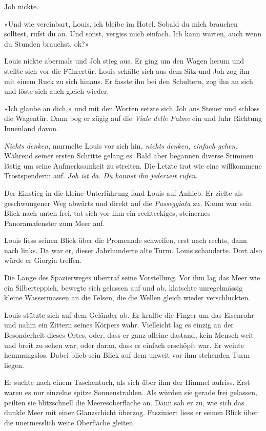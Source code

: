 Joh nickte.

«Und wie vereinbart, Louis, ich bleibe im Hotel. Sobald du mich brauchen
solltest, rufst du an. Und sonst, vergiss mich einfach. Ich kann warten,
auch wenn du Stunden brauchst, ok?»

Louis nickte abermals und Joh stieg aus. Er ging um den Wagen herum und
stellte sich vor die Führertür. Louis schälte sich aus dem Sitz und Joh
zog ihn mit einem Ruck zu sich hinaus. Er fasste ihn bei den Schultern,
zog ihn an sich und löste sich auch gleich wieder.

«Ich glaube an dich,» und mit den Worten setzte sich Joh ans Steuer und
schloss die Wagentür. Dann bog er zügig auf die \emph{Viale delle Palme}
ein und fuhr Richtung Innenland davon.

\emph{Nichts denken,} murmelte Louis vor sich hin\emph{, nichts denken,
einfach gehen.} Während seiner ersten Schritte gelang es. Bald aber
begannen diverse Stimmen lästig um seine Aufmerksamkeit zu streiten. Die
Letzte trat wie eine willkommene Trostspenderin auf. \emph{Joh ist da.
Du kannst ihn jederzeit rufen.}

Der Einstieg in die kleine Unterführung fand Louis auf Anhieb. Er zielte
als geschwungener Weg abwärts und direkt auf die \emph{Passeggiata}
zu\emph{.} Kaum war sein Blick nach unten frei, tat sich vor ihm ein
rechteckiges, steinernes Panoramafenster zum Meer auf.

Louis liess seinen Blick über die Promenade schweifen, erst nach rechts,
dann nach links. Da war er, dieser Jahrhunderte alte Turm. Louis
schauderte. Dort also würde er Giorgia treffen.

Die Länge des Spazierweges übertraf seine Vorstellung. Vor ihm lag das
Meer wie ein Silberteppich, bewegte sich gelassen auf und ab, klatschte
unregelmässig kleine Wassermassen an die Felsen, die die Wellen gleich
wieder verschluckten.

Louis stützte sich auf dem Geländer ab. Er krallte die Finger um das
Eisenrohr und nahm ein Zittern seines Körpers wahr. Vielleicht lag es
einzig an der Besonderheit dieses Ortes, oder, dass er ganz alleine
dastand, kein Mensch weit und breit zu sehen war, oder daran, dass er
einfach erschöpft war. Er weinte hemmungslos. Dabei blieb sein Blick auf
dem unweit vor ihm stehenden Turm liegen.

Er suchte nach einem Taschentuch, als sich über ihm der Himmel aufriss.
Erst waren es nur einzelne spitze Sonnenstrahlen. Als würden sie gerade
frei gelassen, peilten sie blitzschnell die Meeresoberfläche an. Dann
sah er zu, wie sich das dunkle Meer mit einer Glanzschicht überzog.
Fasziniert liess er seinen Blick über die unermesslich weite Oberfläche
gleiten.

